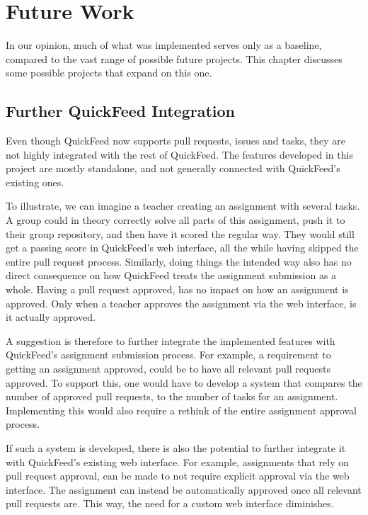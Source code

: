 
\chapter{Future Work}
\label{ch:future-work}

In our opinion, much of what was implemented serves only as a baseline, compared to the vast range of possible future projects.
This chapter discusses some possible projects that expand on this one.

\section{Further QuickFeed Integration}

Even though QuickFeed now supports pull requests, issues and tasks, they are not highly integrated with the rest of QuickFeed.
The features developed in this project are mostly standalone, and not generally connected with QuickFeed's existing ones.

To illustrate, we can imagine a teacher creating an assignment with several tasks.
A group could in theory correctly solve all parts of this assignment, push it to their group repository, and then have it scored the regular way.
They would still get a passing score in QuickFeed's web interface, all the while having skipped the entire pull request process.
Similarly, doing things the intended way also has no direct consequence on how QuickFeed treats the assignment submission as a whole.
Having a pull request approved, has no impact on how an assignment is approved.
Only when a teacher approves the assignment via the web interface, is it actually approved.

A suggestion is therefore to further integrate the implemented features with QuickFeed's assignment submission process.
For example, a requirement to getting an assignment approved, could be to have all relevant pull requests approved.
To support this, one would have to develop a system that compares the number of approved pull requests, to the number of tasks for an assignment.
Implementing this would also require a rethink of the entire assignment approval process.

If such a system is developed, there is also the potential to further integrate it with QuickFeed's existing web interface.
For example, assignments that rely on pull request approval, can be made to not require explicit approval via the web interface.
The assignment can instead be automatically approved once all relevant pull requests are.
This way, the need for a custom web interface diminishes.

